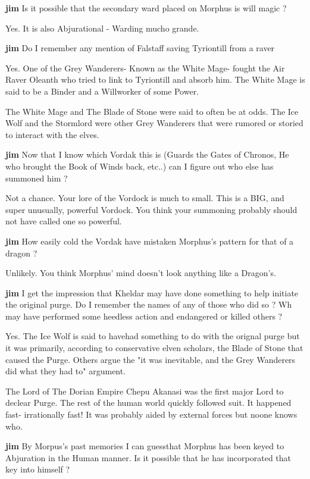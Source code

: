 {\bf jim}
Is it possible that the secondary ward placed on Morphus is 
will magic ?

Yes.  It is also Abjurational - Warding mucho grande.


{\bf jim}
Do I remember any mention of Falstaff saving Tyriontill  from a raver

Yes.  One of the Grey Wanderers- Known as the White Mage- fought the  
Air Raver Oleanth who tried to link to Tyriontill and absorb him.  
The White Mage is said to be a Binder and a Willworker of some Power. 
  
The White Mage and The Blade of Stone were said to often be at odds.  
The  Ice Wolf and the Stormlord were other Grey Wanderers that were 
rumored or storied to interact with the elves.

{\bf jim}
Now that I know which Vordak this is (Guards the Gates of Chronos, 
He who brought the Book of Winds back, etc..) can I figure out who 
else has summoned him ?

Not a chance.  Your lore of the Vordock is much to small.  This 
is a BIG, and super unusually, powerful Vordock.  You think your 
summoning probably  should not have called one so powerful.


{\bf jim}
How easily cold the Vordak have mistaken Morphus's pattern for that of
a dragon ?

Unlikely.  You think Morphus' mind doesn't look anything like a Dragon's.


{\bf jim}
I get the impression that Kheldar may have done something to help
initiate the original purge. Do I remember the names of any of those who
did so ? Wh may have performed some heedless action and endangered or
killed others ?

Yes.  The Ice Wolf is said to havehad something to do with the 
orignal purge  but it was primarily, according to conservative elven 
scholars, the Blade of Stone that caused the Purge.  Others argue the 
"it was inevitable, and the Grey Wanderers did  what they had to" 
argument.   

The Lord of The Dorian Empire Chepu Akanasi was the first major Lord 
to declear Purge.  The rest of the human world quickly followed suit. 
It happened fast- irrationally fast!  It was probably aided by 
external forces but noone knows who. 

{\bf jim}
By Morpus's past memories I can guessthat Morphus has been keyed  to 
Abjuration in the Human manner. Is it possible that he has 
incorporated that key into himself ? 
  
